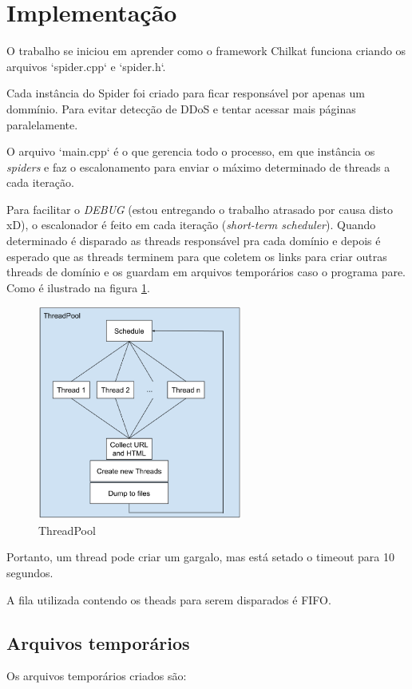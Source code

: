 \section{Implementação}

O trabalho se iniciou em aprender como o framework Chilkat funciona criando os arquivos `spider.cpp` e `spider.h`.

Cada instância do Spider foi criado para ficar responsável por apenas um dommínio. Para evitar detecção de DDoS e tentar acessar mais páginas paralelamente.

O arquivo `main.cpp` é o que gerencia todo o processo, em que instância os \textit{spiders} e faz o escalonamento para enviar o máximo determinado de threads a cada iteração.

Para facilitar o \textit{DEBUG} (estou entregando o trabalho atrasado por causa disto xD), o escalonador é feito em cada iteração (\textit{short-term scheduler}). Quando determinado é disparado as threads responsável pra cada domínio e depois é esperado que as threads terminem para que coletem os links para criar outras threads de domínio e os guardam em arquivos temporários caso o programa pare. Como é ilustrado na figura \ref{fig1}.

\begin{figure}
  \includegraphics[width=0.6\textwidth]{images/aux1.eps}
  \caption{ThreadPool}
  \label{fig1}
\end{figure}

Portanto, um thread pode criar um gargalo, mas está setado o timeout para 10 segundos.

A fila utilizada contendo os theads para serem disparados é FIFO.

\subsection{Arquivos temporários}
Os arquivos temporários criados são:

